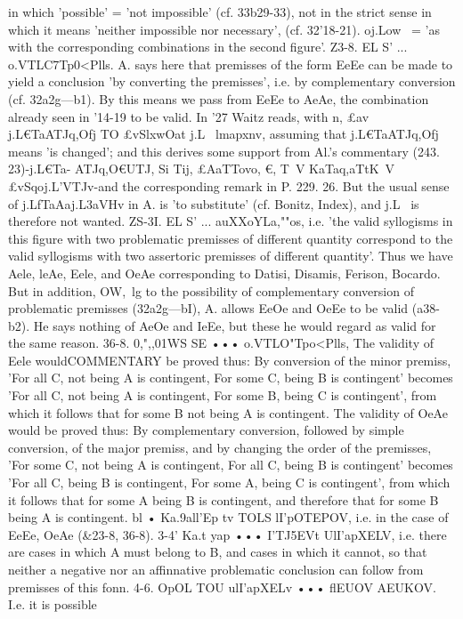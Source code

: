 {{{{{{{{{in which 'possible' = 'not impossible' (cf. 33b29-33), not in the
strict sense in which it means 'neither impossible nor necessary',
(cf. 32'18-21). oj.Lo{w~ = 'as with the corresponding combinations
in the second figure'.
Z3-8. EL S' ... o.VTLC7Tp0<Plls. A. says here that premisses of
the form EeEe can be made to yield a conclusion 'by converting
the premisses', i.e. by complementary conversion (cf. 32a2g---b1).
By this means we pass from EeEe to AeAe, the combination
already seen in '14-19 to be valid.
In '27 Waitz reads, with n, £av j.L€TaATJq,Ofj TO £vSlxwOat j.L~
lmapxnv, assuming that j.L€TaATJq,Ofj means 'is changed'; and this
derives some support from Al.'s commentary (243. 23)-j.L€Ta-
ATJq,O€{UTJ, Si Tij, £AaTTovo, €{, T~V KaTaq,aTtK~V £vSqoj.L'VTJv-and
the corresponding remark in P. 229. 26. But the usual sense of
j.LfTaAaj.L{3aVHv in A. is 'to substitute' (cf. Bonitz, Index), and j.L~
is therefore not wanted.
ZS-3I. EL S' ... auXXoYLa,""os, i.e. 'the valid syllogisms in this
figure with two problematic premisses of different quantity
correspond to the valid syllogisms with two assertoric premisses
of different quantity'. Thus we have Aele, leAe, Eele, and OeAe
corresponding to Datisi, Disamis, Ferison, Bocardo. But in
addition, OW,~lg to the possibility of complementary conversion of
problematic premisses (32a2g---bI), A. allows EeOe and OeEe to be
valid (a38-b2). He says nothing of AeOe and IeEe, but these he
would regard as valid for the same reason.
36-8. 0,",,01WS SE ••• o.VTLO"Tpo<Plls, The validity of Eele wouldCOMMENTARY
be proved thus: By conversion of the minor premiss, 'For all
C, not being A is contingent, For some C, being B is contingent'
becomes 'For all C, not being A is contingent, For some B, being
C is contingent', from which it follows that for some B not being
A is contingent. The validity of OeAe would be proved thus: By
complementary conversion, followed by simple conversion, of the
major premiss, and by changing the order of the premisses, 'For
some C, not being A is contingent, For all C, being B is contingent'
becomes 'For all C, being B is contingent, For some A, being C
is contingent', from which it follows that for some A being B
is contingent, and therefore that for some B being A is contingent.
bl • Ka.9all'Ep tv TOLS lI'pOTEPOV, i.e. in the case of EeEe, OeAe
(&23-8, 36-8).
3-4' Ka.t yap ••• I'TJ5EVt UlI'apXELV, i.e. there are cases in which
A must belong to B, and cases in which it cannot, so that neither
a negative nor an affinnative problematic conclusion can follow
from premisses of this fonn.
4-6. OpOL TOU ulI'apXELv ••• flEUOV AEUKOV. I.e. it is possible
}}}}}}}}}}}}}
